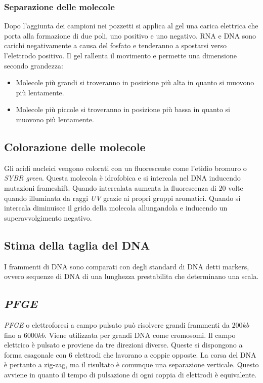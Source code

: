 		\subsubsection{Separazione delle molecole}
		Dopo l'aggiunta dei campioni nei pozzetti si applica al gel una carica elettrica che porta alla formazione di due poli, uno positivo e uno negativo.
		RNA e DNA sono carichi negativamente a causa del fosfato e tenderanno a spostarsi verso l'elettrodo positivo.
		Il gel rallenta il movimento e permette una dimensione secondo grandezza:
		\begin{multicols}{2}
			\begin{itemize}
				\item Molecole pi\`u grandi si troveranno in posizione pi\`u alta in quanto si muovono pi\`u lentamente.
				\item Molecole pi\`u piccole si troveranno in posizione pi\`u bassa in quanto si muovono pi\`u lentamente.
			\end{itemize}
		\end{multicols}
		
	\subsection{Colorazione delle molecole}
	Gli acidi nucleici vengono colorati con un fluorescente come l'etidio bromuro o \emph{SYBR green}.
	Questa molecola \`e idrofobica e si intercala nel DNA inducendo mutazioni frameshift.
	Quando intercalata aumenta la fluorescenza di $20$ volte quando illuminata da raggi \emph{UV} grazie ai propri gruppi aromatici.
	Quando si intercala diminuisce il grido della molecola allungandola e inducendo un superavvolgimento negativo.

	\subsection{Stima della taglia del DNA}
	I frammenti di DNA sono comparati con degli standard di DNA detti markers, ovvero sequenze di DNA di una lunghezza prestabilita che determinano una scala.

	\subsection{\emph{PFGE}}
	\emph{PFGE} o elettroforesi a campo pulsato pu\`o risolvere grandi frammenti da $200kb$ fino a $6000kb$.
	Viene utilizzata per grandi DNA come cromosomi.
	Il campo elettrico \`e pulsato e proviene da tre direzioni diverse.
	Queste si dispongono a forma esagonale con $6$ elettrodi che lavorano a coppie opposte.
	La corsa del DNA \`e pertanto a zig-zag, ma il risultato \`e comunque una separazione verticale.
	Questo avviene in quanto il tempo di pulsazione di ogni coppia di elettrodi \`e equivalente.

